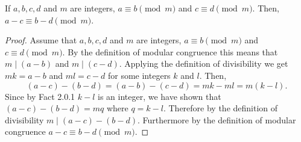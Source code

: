 \documentclass{report}
\begin{document}
\begin{proposition}{}{}
  If $a,b,c,d$ and $m$ are integers, $a \equiv b \pmod{m}$ and $c \equiv d \pmod{m}$. Then, $a - c \equiv b - d \pmod{m}$.
\end{proposition}

\begin{proof}
  Assume that $a,b,c,d$ and $m$ are integers, $a \equiv b \pmod{m}$ and $c \equiv d \pmod{m}$.
  By the definition of modular congruence this means that $m \mid (a - b)$ and $m \mid (c - d)$.
  Applying the definition of divisibility we get $mk = a - b$ and $ml = c - d$ for some integers $k$ and $l$.
  Then, $$(a - c) -(b - d) = (a - b) -(c - d) = mk - ml = m(k-l).$$
  Since by Fact 2.0.1 $k - l$ is an integer, we have shown that $(a - c) - (b - d) = mq$ where $q = k - l$.
  Therefore by the definition of divisibility $m \mid (a - c) - (b - d)$.
  Furthermore by the definition of modular congruence $a - c \equiv b - d \pmod{m}$.
\end{proof}
\end{document}
